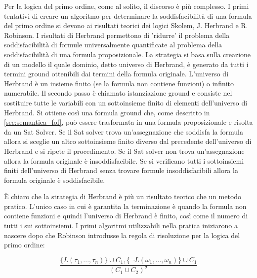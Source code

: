 \documentclass[./main.tex]{subfiles}
\begin{document}
Per la logica del primo ordine, come al solito, il discorso è più complesso.
I primi tentativi di creare un algoritmo per determinare la soddisfacibilità di una formula del primo ordine si
devono ai risultati teorici dei logici 
Skolem, J. Herbrand e R. Robinson. 
I risultati di Herbrand permettono di 'ridurre' il problema della soddisfacibilità di formule universalmente quantificate
al problema della soddisfacibilità di una formula proposizionale. La strategia si basa sulla creazione di un modello 
il quale dominio, detto universo di Herbrand, è generato da tutti i termini ground ottenibili dai termini della formula originale.
L'universo di Herbrand è un insieme finito (se la formula non contiene funzioni) o infinito numerabile. Il secondo passo è 
chiamato istanziazione ground e consiste nel sostituire tutte le variabili con un sottoinsieme finito di elementi dell'universo di Herbrand.
Si ottiene così una formula ground che, come descritto in \ref{sec:semantica_fof}, può essere trasformata in una formula proposizionale e risolta da un Sat Solver. 
Se il Sat solver trova un'assegnazione che soddisfa la formula allora si sceglie un altro sottoinsieme finito diverso dal precedente dell'universo di Herbrand 
e si ripete il procedimento. Se il Sat solver non trova un'assegnazione allora la formula originale è insoddisfacibile.
Se si verificano tutti i sottoinsiemi finiti dell'universo di Herbrand senza trovare formule insoddisfacibili allora la formula originale è soddisfacibile.

È chiaro che la strategia di Herbrand è più un risultato teorico che un metodo pratico.
L'unico caso in cui è garantita la terminazione è quando la formula non contiene funzioni
e quindi l'universo di Herbrand è finito, così come il numero di tutti i sui sottoinsiemi.
I primi algoritmi utilizzabili nella pratica iniziarono a nascere dopo che Robinson introdusse la regola di risoluzione per la logica del primo ordine:

$$ \frac{\{L(\tau_1, ..., \tau_n)\} \cup C_1, \{\lnot L(\omega_1, ..., \omega_n)\} \cup C_1}{(C_1 \cup C_2)^\sigma} $$
\end{document}
